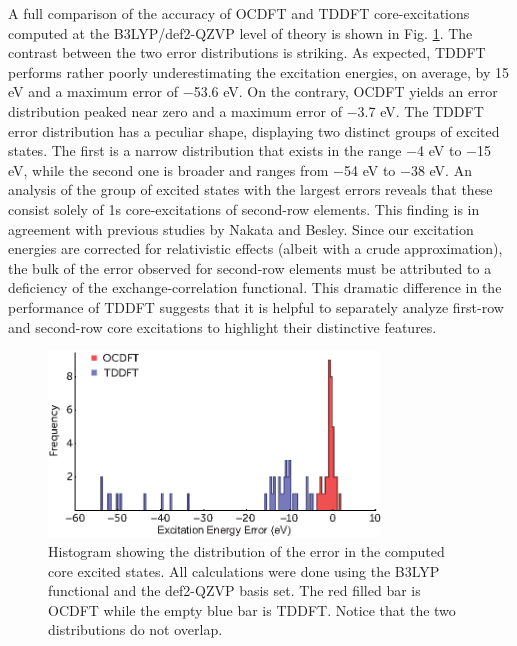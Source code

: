 \documentclass[12pt]{article}
\begin{document}
A full comparison of the accuracy of OCDFT and TDDFT core-excitations computed at the B3LYP/def2-QZVP level of theory is shown in Fig. \ref{figure:Hist}.
The contrast between the two error distributions is striking.  As expected, TDDFT performs rather poorly underestimating the excitation energies, on average, by 15 eV and a maximum error of $-$53.6 eV. 
On the contrary, OCDFT yields an error distribution peaked near zero and a maximum error of $-$3.7 eV.
The TDDFT error distribution has a peculiar shape, displaying two distinct groups of excited states. The first is a narrow distribution that exists in the range $-$4 eV to $-$15 eV, while the second one is broader and ranges from $-$54 eV to $-$38 eV. An analysis of the group of excited states with the largest errors reveals that these consist solely of 1s core-excitations of second-row elements. This finding is in agreement with previous studies by Nakata \cite{nakata_extension_2007} and Besley. \cite{besley_time-dependent_2009} Since our excitation energies are corrected for relativistic effects (albeit with a crude approximation), the bulk of the error observed for second-row elements must be attributed to a deficiency of the exchange-correlation functional.\cite{saue_relativistic_2011} This dramatic difference in the performance of TDDFT suggests that it is helpful to separately analyze first-row and second-row core excitations to highlight their distinctive features.

\begin{figure}[b]
\centering
\includegraphics[width=8.8cm]{figure_4.eps}
\caption{Histogram showing the distribution of the error in the computed core excited states. All calculations were done using the B3LYP functional and the def2-QZVP basis set. The red filled bar is OCDFT while the empty blue bar is TDDFT. Notice that the two distributions do not overlap.}
\label{figure:Hist}
\end{figure}
\end{document}
